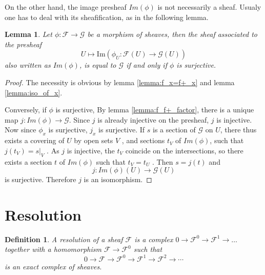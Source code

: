 \documentclass{article}
\numberwithin{equation}{subsection} %
\newtheorem{defi}{Definition}[section]
\newtheorem{lemma}{Lemma}[section]
\theoremstyle{definition}
\begin{document}
On the other hand, the image presheaf $Im(\phi)$ is not necessarily a sheaf. Usualy one has to deal with its sheafification, as in the following lemma.
\begin{lemma}
    Let $\phi :\mathcal{F}\to \mathcal{G}$ be a morphism of sheaves, then the sheaf associated to the presheaf
    $$U\mapsto \text{Im}\left(\phi _U:\mathcal{F}(U)\to \mathcal{G}(U)\right)$$
    also written as $Im(\phi)$, is equal to $ \mathcal{G}$ if and only if $\phi$ is surjective.
\end{lemma}
\begin{proof}
	The necessity is obvious by lemma \ref{lemma:f_x=f+_x} 
	and lemma \ref{lemma:iso_of_x}.

	Conversely, if $\phi$ is surjective, By lemma \ref{lemma:f_f+_factor},
	there is a unique map $j:Im(\phi) \to \mathcal{G}$.
	Since $j$ is already injective
	on the presheaf, $j$ is injective. Now since $\phi_x$ is
	surjective, $j_x$ is surjective. If $s$ is a section of 
	$ \mathcal{G}$ on $U$, there
	thus exists a covering of $U$ by open sets $V$ , and sections $t_V$ of 
	$Im(\phi)$, such that
	$j(t_V) = s|_V$ . As $j$ is injective, the $t_V$ coincide on the
	intersections, so there
	exists a section $t$ of $Im(\phi)$ such that $t_V=t_U$ . Then
	$s=j(t)$ and
	$$j:Im(\phi)(U)\to \mathcal{G}(U)$$
	is surjective. Therefore $j$ is an isomorphism. 
\end{proof}

\section{Resolution}

\begin{defi}
A resolution of a sheaf $\mathcal{F}$ is a complex $0\to \mathcal{F}^0 \to \mathcal{F}^1 \to \dots$ together with a homomorphism $\mathcal{F} \to \mathcal{F}^0$ such that
\[
0\longrightarrow \mathcal{F}\longrightarrow \mathcal{F}^0\longrightarrow \mathcal{F}^1\longrightarrow \mathcal{F}^2\longrightarrow \cdots
\]
is an exact complex of sheaves.
\end{defi}
\end{document}
